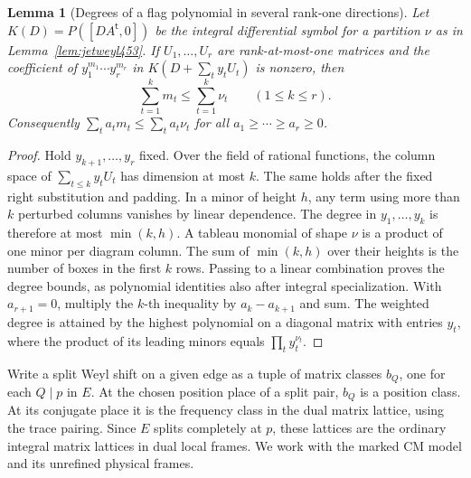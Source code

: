 \documentclass[a4paper,11pt]{article}
\newtheorem{lemma}[proposition]{Lemma}
\theoremstyle{definition}
\theoremstyle{remark}
\numberwithin{equation}{section}
\begin{document}
\begin{lemma}[Degrees of a flag polynomial in several rank-one directions]\leavevmode
\label{lem:flagdegree456}
Let \(K(D)=P([D A^{\mathsf t},0])\) be the integral differential
symbol for a partition \(\nu\) as in Lemma~\ref{lem:jetweyl453}.
If \(U_1,\ldots,U_r\) are rank-at-most-one matrices and the
coefficient of \(y_1^{m_1}\cdots y_r^{m_r}\) in
\(K(D+\sum_t y_t U_t)\) is nonzero, then
\[
       \sum_{t=1}^k m_t\le\sum_{t=1}^k\nu_t
                        \qquad(1\le k\le r).
\]
Consequently \(\sum_t a_t m_t\le\sum_t a_t\nu_t\) for all
\(a_1\ge\cdots\ge a_r\ge0\).
\end{lemma}
\begin{proof}
Hold \(y_{k+1},\ldots,y_r\) fixed. Over the field of rational
functions, the column space of \(\sum_{t\le k}y_t U_t\) has
dimension at most \(k\). The same holds after the fixed right
substitution and padding. In a minor of height \(h\), any term
using more than \(k\) perturbed columns vanishes by linear
dependence. The degree in \(y_1,\ldots,y_k\) is therefore at
most \(\min(k,h)\). A tableau monomial of shape \(\nu\) is
a product of one minor per diagram column. The sum of
\(\min(k,h)\) over their heights is the number of boxes in
the first \(k\) rows. Passing to a linear combination proves
the degree bounds, as polynomial identities also after
integral specialization. With \(a_{r+1}=0\), multiply the
\(k\)-th inequality by \(a_k-a_{k+1}\) and sum.
The weighted degree is attained by the highest polynomial on a
diagonal matrix with entries \(y_t\), where the product of its
leading minors equals \(\prod_t y_t^{\nu_t}\).
\end{proof}

Write a split Weyl shift on a given edge as a tuple of matrix
classes \(b_Q\), one for each \(Q\mid p\) in \(E\). At the
chosen position place of a split pair, \(b_Q\) is a position
class. At its conjugate place it is the frequency class in
the dual matrix lattice, using the trace pairing. Since \(E\)
splits completely at \(p\), these lattices are the ordinary
integral matrix lattices in dual local frames. We work with
the marked CM model and its unrefined physical frames.
\end{document}
